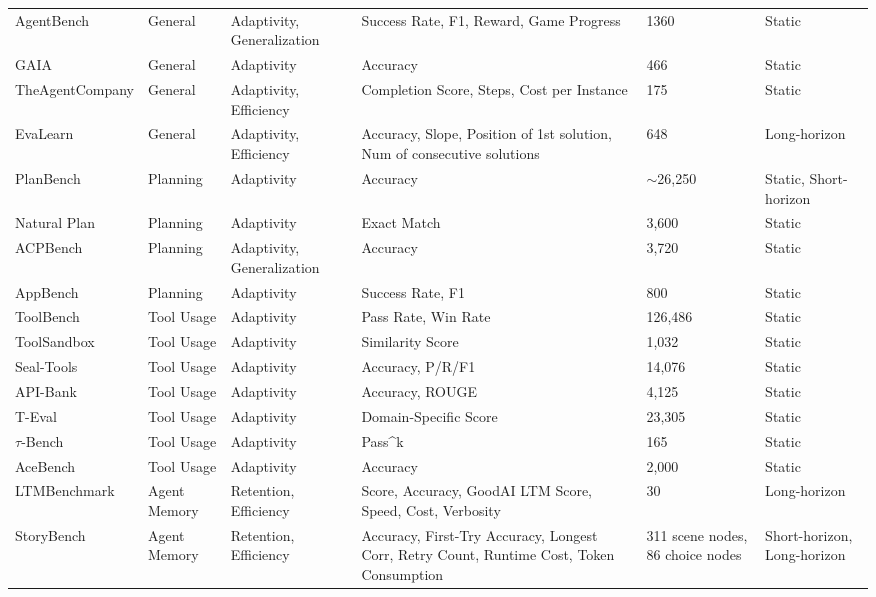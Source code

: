 \documentclass[10pt]{article} %
\begin{document}
\begin{table}[t!]
{\begin{tabular}{m{5.5cm}m{4.5cm}m{4cm}m{5cm}m{2.5cm}m{4cm}}
AgentBench\citep{liu2023agentbench} & General & Adaptivity, Generalization & Success Rate, F1, Reward, Game Progress & 1360 & Static \\
GAIA\citep{mialon2023gaia} & General & Adaptivity & Accuracy & 466 & Static \\
TheAgentCompany\citep{xu2024theagentcompany} & General & Adaptivity, Efficiency & Completion Score, Steps, Cost per Instance & 175 & Static \\
EvaLearn\citep{dou2025evalearnquantifyinglearningcapability} & General & Adaptivity, Efficiency & Accuracy, Slope, Position of 1st solution, Num of consecutive solutions & 648 & Long-horizon \\
PlanBench\citep{valmeekam2023planbench} & Planning & Adaptivity & Accuracy & $\sim$26,250 & Static, Short-horizon \\
Natural Plan\citep{zheng2024natural} & Planning & Adaptivity & Exact Match & 3,600 & Static \\
ACPBench\citep{kokel2025acpbench} & Planning & Adaptivity, Generalization & Accuracy & 3,720 & Static \\
AppBench~\citep{wang-etal-2024-appbench} & Planning & Adaptivity & Success Rate, F1 & 800 & Static \\
ToolBench\citep{qin2023toolllm} & Tool Usage & Adaptivity & Pass Rate, Win Rate & 126,486 & Static \\
ToolSandbox\citep{lu2024toolsandbox} & Tool Usage & Adaptivity & Similarity Score & 1,032 & Static \\
Seal-Tools\citep{wu2024seal} & Tool Usage & Adaptivity & Accuracy, P/R/F1 & 14,076 & Static \\
API-Bank\citep{li2023api} & Tool Usage & Adaptivity & Accuracy, ROUGE & 4,125 & Static \\
T-Eval\citep{chen2023t} & Tool Usage & Adaptivity & Domain-Specific Score & 23,305 & Static \\
$\tau$-Bench\citep{yao2024tau} & Tool Usage & Adaptivity & {Pass\textasciicircum k}& 165 & Static \\
AceBench\citep{chen2025acebench} & Tool Usage & Adaptivity & Accuracy & 2,000 & Static \\
LTMBenchmark\citep{castillo-bolado2024beyond} & Agent Memory & Retention, Efficiency & Score, Accuracy, GoodAI LTM Score, Speed, Cost, Verbosity & 30 & Long-horizon \\
StoryBench\citep{wan2025storybench} & Agent Memory & Retention, Efficiency & Accuracy, First-Try Accuracy, Longest Corr, Retry Count, Runtime Cost, Token Consumption & 311 scene nodes, 86 choice nodes & Short-horizon, Long-horizon \\

\end{tabular}}
\end{table}
\end{document}
